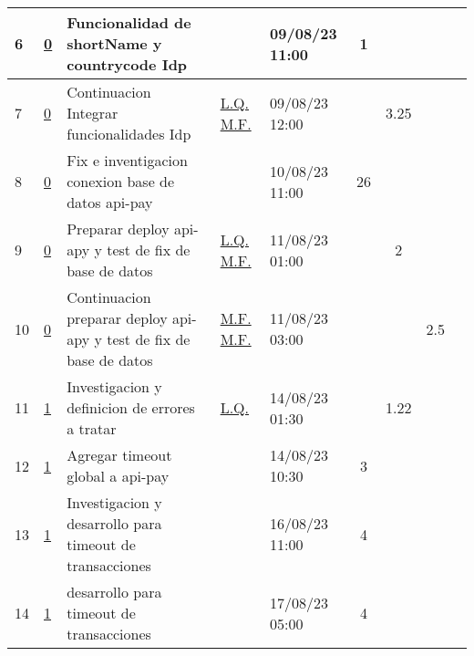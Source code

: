 \documentclass{article}
\begin{document}
\begin{longtable}{|m{0.5cm}|m{1.2cm}|p{5cm}|m{1.5cm}|m{1.5cm}||c|c|c|c||}
                 \label{6}6  &  \hyperref[0]{\color{blue}0}  & Funcionalidad de shortName y countrycode Idp &  
                 & 09/08/23 11:00  & 1 &  &  & \\ \hline 

                 \label{7}7  &  \hyperref[0]{\color{blue}0}  & Continuacion Integrar funcionalidades Idp &  
                  \hyperref[L.Q.]{\color{blue}L.Q.} \newline  \hyperref[M.F.]{\color{blue}M.F.}  & 09/08/23 12:00  &  & 3.25 &  & \\ \hline 

                 \label{8}8  &  \hyperref[0]{\color{blue}0}  & Fix e inventigacion conexion base de datos api-pay &  
                 & 10/08/23 11:00  & 26 &  &  & \\ \hline 

                 \label{9}9  &  \hyperref[0]{\color{blue}0}  & Preparar deploy api-apy y test de fix de base de datos &  
                  \hyperref[L.Q.]{\color{blue}L.Q.} \newline  \hyperref[M.F.]{\color{blue}M.F.}  & 11/08/23 01:00  &  & 2 &  & \\ \hline 

                 \label{10}10  &  \hyperref[0]{\color{blue}0}  & Continuacion preparar deploy api-apy y test de fix de base de datos &  
                  \hyperref[M.F.]{\color{blue}M.F.} \newline  \hyperref[M.F.]{\color{blue}M.F.}  & 11/08/23 03:00  &  &  & 2.5 & \\ \hline 

                 \label{11}11  &  \hyperref[1]{\color{blue}1}  & Investigacion y definicion de errores a tratar &  
                  \hyperref[L.Q.]{\color{blue}L.Q.}  & 14/08/23 01:30  &  & 1.22 &  & \\ \hline 

                 \label{12}12  &  \hyperref[1]{\color{blue}1}  & Agregar timeout global a api-pay &  
                 & 14/08/23 10:30  & 3 &  &  & \\ \hline 

                 \label{13}13  &  \hyperref[1]{\color{blue}1}  & Investigacion y desarrollo para timeout de transacciones &  
                 & 16/08/23 11:00  & 4 &  &  & \\ \hline 

                 \label{14}14  &  \hyperref[1]{\color{blue}1}  & desarrollo para timeout de transacciones &  
                 & 17/08/23 05:00  & 4 &  &  & \\ \hline 


\end{longtable}
\end{document}
